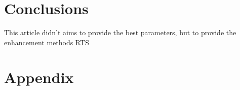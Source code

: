 \documentclass[10pt,twocolumn,letterpaper]{article}
\begin{document}

\section{Conclusions}
\label{sec:5}
This article didn't aims to provide the best parameters, but to provide the enhancement methods RTS 








{\small


}

\newpage
\appendix
\section{Appendix}
\label{appendix}
\end{document}
